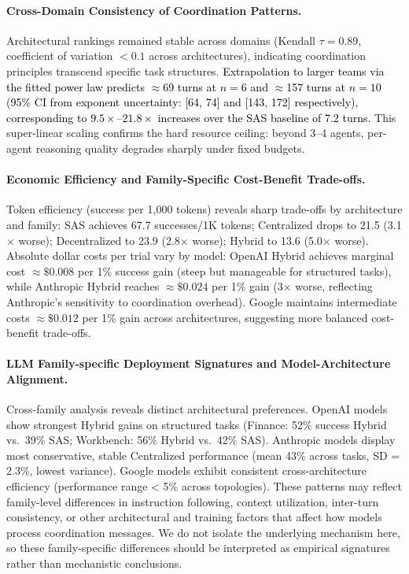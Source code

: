   \paragraph{Cross-Domain Consistency of Coordination Patterns.}
  Architectural rankings remained stable across domains (Kendall $\tau = 0.89$, coefficient of variation $< 0.1$ across architectures), indicating coordination principles transcend specific task structures. \textcolor{black}{Extrapolation to larger teams via the fitted power law predicts $\approx$69 turns at $n{=}6$ and $\approx$157 turns at $n{=}10$ (95\% CI from exponent uncertainty: [64, 74] and [143, 172] respectively), corresponding to $9.5\times$--$21.8\times$ increases over the SAS baseline of 7.2 turns.} This super-linear scaling confirms the hard resource ceiling: beyond 3--4 agents, per-agent reasoning quality degrades sharply under fixed budgets.
  
  \paragraph{Economic Efficiency and Family-Specific Cost-Benefit Trade-offs.}
  Token efficiency (success per 1,000 tokens) reveals sharp trade-offs by architecture and family: SAS achieves 67.7 successes/1K tokens; Centralized drops to 21.5 (3.1$\times$ worse); Decentralized to 23.9 (2.8$\times$ worse); Hybrid to 13.6 (5.0$\times$ worse). Absolute dollar costs per trial vary by model: OpenAI Hybrid achieves marginal cost $\approx\$0.008$ per 1\% success gain (steep but manageable for structured tasks), while Anthropic Hybrid reaches $\approx\$0.024$ per 1\% gain (3$\times$ worse, reflecting Anthropic's sensitivity to coordination overhead). Google maintains intermediate costs $\approx\$0.012$ per 1\% gain across architectures, suggesting more balanced cost-benefit trade-offs.
  
  \paragraph{LLM Family-specific Deployment Signatures and Model-Architecture Alignment.}
  Cross-family analysis reveals distinct architectural preferences. OpenAI models show strongest Hybrid gains on structured tasks (Finance: 52\% success Hybrid vs.\ 39\% SAS; Workbench: 56\% Hybrid vs.\ 42\% SAS). Anthropic models display most conservative, stable Centralized performance (mean 43\% across tasks, SD = 2.3\%, lowest variance). Google models exhibit consistent cross-architecture efficiency (performance range < 5\% across topologies). These patterns may reflect family-level differences in instruction following, context utilization, inter-turn consistency, or other architectural and training factors that affect how models process coordination messages. We do not isolate the underlying mechanism here, so these family-specific differences should be interpreted as empirical signatures rather than mechanistic conclusions.

